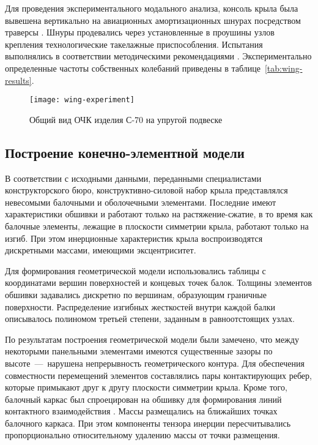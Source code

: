 Для проведения экспериментального модального анализа, консоль крыла была вывешена вертикально на авиационных амортизационных шнурах посредством траверсы . Шнуры продевались через установленные в проушины узлов крепления технологические такелажные приспособления. Испытания выполнялись в соответствии методическими рекомендациями \cite{lib:aprobation:Moskalik}. Экспериментально определенные частоты собственных колебаний приведены в таблице~\ref{tab:wing-results}.

\begin{figure}[H]
	\centerfloat
	\texttt{[image: wing-experiment]}
	\caption{Общий вид ОЧК изделия \mbox{С-70} на упругой подвеске} \label{fig:wing-experiment}
\end{figure}

\subsection{Построение конечно-элементной модели}

В соответствии с исходными данными, переданными специалистами конструкторского бюро, конструктивно-силовой набор крыла представлялся невесомыми балочными и оболочечными элементами. Последние имеют характеристики обшивки и работают только на растяжение-сжатие, в то время как балочные элементы, лежащие в плоскости симметрии крыла, работают только на изгиб. При этом инерционные характеристик крыла воспроизводятся дискретными массами, имеющими эксцентриситет.

Для формирования геометрической модели использовались таблицы с координатами вершин поверхностей и концевых точек балок. Толщины элементов обшивки задавались дискретно по вершинам, образующим граничные поверхности. Распределение изгибных жесткостей внутри каждой балки описывалось полиномом третьей степени, заданным в равноотстоящих узлах. 

По результатам построения геометрической модели были замечено, что между некоторыми панельными элементами имеются существенные зазоры по высоте~---~нарушена непрерывность геометрического контура. Для обеспечения совместности перемещений элементов составлялись пары контактирующих ребер, которые примыкают друг к другу плоскости симметрии крыла. Кроме того, балочный каркас был спроецирован на обшивку для формирования линий контактного взаимодействия . Массы размещались на ближайших точках балочного каркаса. При этом компоненты тензора инерции пересчитывались пропорционально относительному удалению массы от точки размещения. 

